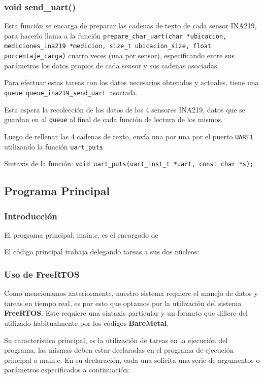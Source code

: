                 \subsubsection{void send\_uart()}
                    Esta función se encarga de preparar las cadenas de texto de cada sensor INA219, para hacerlo llama a la función \texttt{prepare\_char\_uart(char *ubicacion, mediciones\_ina219 *medicion, size\_t ubicacion\_size, float porcentaje\_carga)} cuatro veces (una por sensor), especificando entre sus parámetros los datos propios de cada sensor y sus cadenas asociadas.\par
                    Para efectuar estas tareas con los datos necesarios obtenidos y actuales, tiene una \texttt{queue queue\_ina219\_send\_uart }asociada.\par

                    \par                    
                    
                    Esta espera la recolección de los datos de los 4 sensores INA219, datos que se guardan en al \texttt{queue} al final de cada función de lectura de los mismos.\par
                    Luego de rellenar las 4 cadenas de texto, envía una por una por el puerto \texttt{UART1} utilizando la función \texttt{uart\_puts}\par
                    Sintaxis de la función: \texttt{void uart\_puts(uart\_inst\_t *uart, const char *s);}
                    
            \subsection{Programa Principal}
                \subsubsection{Introducción}
                    El programa principal, main.c, es el encargado de\par
                    El código principal trabaja delegando tareas a sus dos núcleos:\par
                \subsubsection{Uso de FreeRTOS}
                    Como mencionamos anteriormente, nuestro sistema requiere el manejo de datos y tareas en tiempo real, es por esto que optamos por la utilización del sistema \textbf{FreeRTOS}. Este requiere una sintaxis particular y un formato que difiere del utilizado habitualmente por los códigos \textbf{BareMetal}.\par
                    Su característica principal, es la utilización de tareas en la ejecución del programa, las mismas deben estar declaradas en el programa de ejecución principal o main.c. En su declaración, cada una solicita una serie de argumentos o parámetros especificados a continuación:\par

